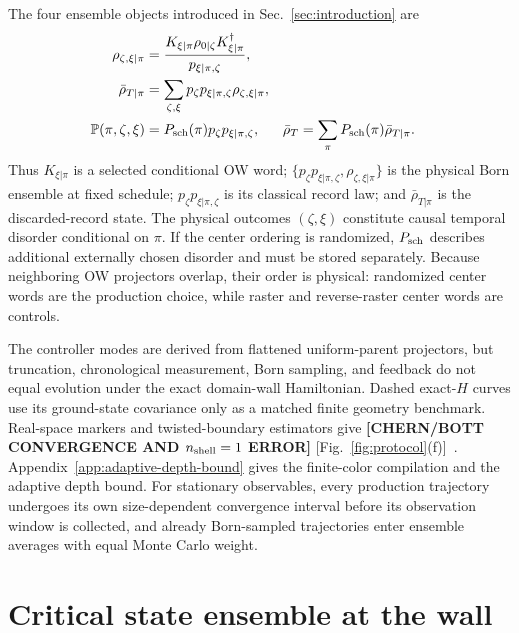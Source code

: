 \documentclass[aps,prx,twocolumn,superscriptaddress,longbibliography,nofootinbib,floatfix]{revtex4-2}
\newcommand{\ResultValue}[1]{\textcolor{BrickRed}{\textbf{[#1]}}}
\begin{document}
The four ensemble objects introduced in Sec.~\ref{sec:introduction} are
\begin{equation}
 \begin{aligned}
  \rho_{\zeta,\xi|\pi}
  &=\frac{K_{\xi|\pi}\rho_{0|\zeta}K_{\xi|\pi}^\dagger}
  {p_{\xi|\pi,\zeta}},\\
  \bar\rho_{T|\pi}
  &=\sum_{\zeta,\xi}p_\zeta p_{\xi|\pi,\zeta}
  \rho_{\zeta,\xi|\pi},\\
  \mathbb P(\pi,\zeta,\xi)
  &=P_{\rm sch}(\pi)p_\zeta p_{\xi|\pi,\zeta},
  &\bar\rho_T&=\sum_\pi P_{\rm sch}(\pi)\bar\rho_{T|\pi}.
 \end{aligned}
 \label{eq:record-K-p}
\end{equation}
Thus \(K_{\xi|\pi}\) is a selected conditional OW word;
\(\{p_\zeta p_{\xi|\pi,\zeta},\rho_{\zeta,\xi|\pi}\}\) is the physical Born
ensemble at fixed schedule; \(p_\zeta p_{\xi|\pi,\zeta}\) is its classical
record law; and \(\bar\rho_{T|\pi}\) is the discarded-record state.  The
physical outcomes \((\zeta,\xi)\) constitute causal temporal disorder
conditional on \(\pi\).  If the center ordering is randomized,
\(P_{\rm sch}\) describes additional externally chosen disorder and must be
stored separately.  Because neighboring OW projectors overlap, their order
is physical: randomized center words are the production choice, while raster
and reverse-raster center words are controls.

The controller modes are derived from flattened uniform-parent projectors,
but truncation, chronological measurement, Born sampling, and feedback do
not equal evolution under the exact domain-wall Hamiltonian.  Dashed
exact-\(H\) curves use its ground-state covariance only as a matched finite
geometry benchmark.  Real-space markers and twisted-boundary estimators give
\ResultValue{CHERN/BOTT CONVERGENCE AND $n_{\rm shell}=1$ ERROR}
[Fig.~\ref{fig:protocol}(f)]~\cite{BiancoResta2011,BauMarrazzo2024,
FukuiHatsugaiSuzuki2005}.  Appendix~\ref{app:adaptive-depth-bound} gives the
finite-color compilation and the adaptive depth bound.  For stationary
observables, every production trajectory undergoes its own size-dependent
convergence interval before its observation window is collected, and
already Born-sampled trajectories enter ensemble averages with equal Monte
Carlo weight.

\section{Critical state ensemble at the wall}
\label{sec:state-cft}
\end{document}
